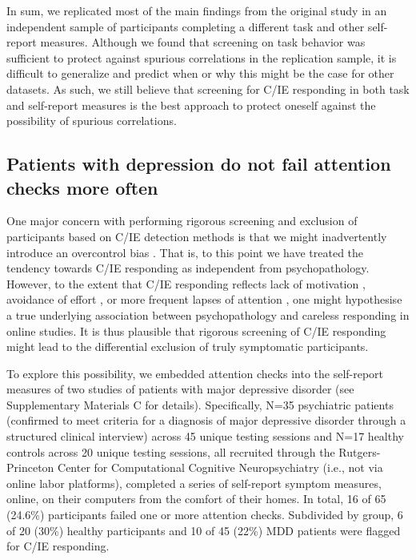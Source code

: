 \documentclass[a4paper,notitlepage,12pt]{article}
\begin{document}
In sum, we replicated most of the main findings from the original study in an independent sample of participants completing a different task and other self-report measures. Although we found that screening on task behavior was sufficient to protect against spurious correlations in the replication sample, it is difficult to generalize and predict when or why this might be the case for other datasets. As such, we still believe that screening for C/IE responding in both task and self-report measures is the best approach to protect oneself against the possibility of spurious correlations.

\subsection*{Patients with depression do not fail attention checks more often}

One major concern with performing rigorous screening and exclusion of participants based on C/IE detection methods is that we might inadvertently introduce an overcontrol bias \cite{elwert2014endogenous}. That is, to this point we have treated the tendency towards C/IE responding as independent from psychopathology. However, to the extent that C/IE responding reflects lack of motivation \cite{barch2015mechanisms}, avoidance of effort \cite{cohen2001impairments, culbreth2016negative}, or more frequent lapses of attention \cite{kane2016individual, robison2017neurotic}, one might hypothesise a true underlying association between psychopathology and careless responding in online studies. It is thus plausible that rigorous screening of C/IE responding might lead to the differential exclusion of truly symptomatic participants. 

To explore this possibility, we embedded attention checks into the self-report measures of two studies of patients with major depressive disorder (see Supplementary Materials C for details). Specifically, N=35 psychiatric patients (confirmed to meet criteria for a diagnosis of major depressive disorder through a structured clinical interview) across 45 unique testing sessions and N=17 healthy controls across 20 unique testing sessions, all recruited through the Rutgers-Princeton Center for Computational Cognitive Neuropsychiatry (i.e., not via online labor platforms), completed a series of self-report symptom measures, online, on their computers from the comfort of their homes. In total, 16 of 65 (24.6\%) participants failed one or more attention checks. Subdivided by group, 6 of 20 (30\%) healthy participants and 10 of 45 (22\%) MDD patients were flagged for C/IE responding.
\end{document}
